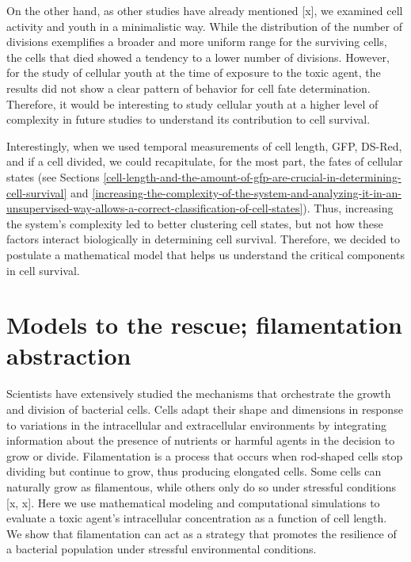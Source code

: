 \documentclass[a4paper, nobind]{templates/ociamthesis}
\begin{document}
On the other hand, as other studies have already mentioned {[}x{]}, we examined cell activity and youth in a minimalistic way.
While the distribution of the number of divisions exemplifies a broader and more uniform range for the surviving cells, the cells that died showed a tendency to a lower number of divisions.
However, for the study of cellular youth at the time of exposure to the toxic agent, the results did not show a clear pattern of behavior for cell fate determination.
Therefore, it would be interesting to study cellular youth at a higher level of complexity in future studies to understand its contribution to cell survival.

Interestingly, when we used temporal measurements of cell length, GFP, DS-Red, and if a cell divided, we could recapitulate, for the most part, the fates of cellular states (see Sections \ref{cell-length-and-the-amount-of-gfp-are-crucial-in-determining-cell-survival} and \ref{increasing-the-complexity-of-the-system-and-analyzing-it-in-an-unsupervised-way-allows-a-correct-classification-of-cell-states}).
Thus, increasing the system's complexity led to better clustering cell states, but not how these factors interact biologically in determining cell survival.
Therefore, we decided to postulate a mathematical model that helps us understand the critical components in cell survival.

\hypertarget{filamentation-abstraction}{%
\chapter{Models to the rescue; filamentation abstraction}\label{filamentation-abstraction}}

\minitoc 

\noindent Scientists have extensively studied the mechanisms that orchestrate the growth and division of bacterial cells.
Cells adapt their shape and dimensions in response to variations in the intracellular and extracellular environments by integrating information about the presence of nutrients or harmful agents in the decision to grow or divide.
Filamentation is a process that occurs when rod-shaped cells stop dividing but continue to grow, thus producing elongated cells.
Some cells can naturally grow as filamentous, while others only do so under stressful conditions {[}x, x{]}.
Here we use mathematical modeling and computational simulations to evaluate a toxic agent's intracellular concentration as a function of cell length.
We show that filamentation can act as a strategy that promotes the resilience of a bacterial population under stressful environmental conditions.
\end{document}
